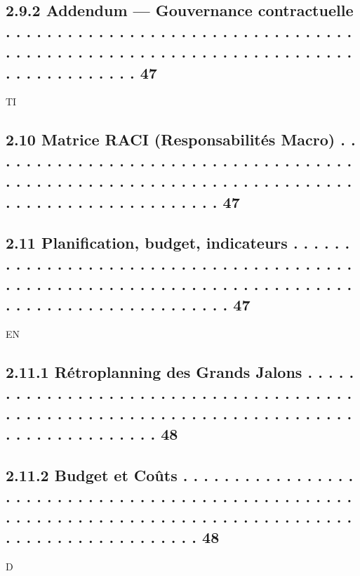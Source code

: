 \documentclass[12pt,landscape,a4paper]{article}
\begin{document}
\subsection{2.9.2               Addendum — Gouvernance contractuelle . . . . . . . . . . . . . . . . . . . . . . . . . . . . . . . . . . . . . . . . . . . . . . . . . . . . . . . . . . . . . . . . . . . . . . . . . . . . . . . . . 47}
\vspace{0.5em}
\vspace{0.5em}
\vspace{0.5em}
\vspace{0.5em}
TI\\
\subsection{2.10    Matrice RACI (Responsabilités Macro) . . . . . . . . . . . . . . . . . . . . . . . . . . . . . . . . . . . . . . . . . . . . . . . . . . . . . . . . . . . . . . . . . . . . . . . . . . . . . . . . . . . . . . . . . . . 47}
\subsection{2.11    Planification, budget, indicateurs . . . . . . . . . . . . . . . . . . . . . . . . . . . . . . . . . . . . . . . . . . . . . . . . . . . . . . . . . . . . . . . . . . . . . . . . . . . . . . . . . . . . . . . . . . . . . . . . 47}
\vspace{0.5em}
\vspace{0.5em}
\vspace{0.5em}
\vspace{0.5em}
EN\\
\subsection{2.11.1              Rétroplanning des Grands Jalons . . . . . . . . . . . . . . . . . . . . . . . . . . . . . . . . . . . . . . . . . . . . . . . . . . . . . . . . . . . . . . . . . . . . . . . . . . . . . . . . . . . . . . . . 48}
\subsection{2.11.2              Budget et Coûts . . . . . . . . . . . . . . . . . . . . . . . . . . . . . . . . . . . . . . . . . . . . . . . . . . . . . . . . . . . . . . . . . . . . . . . . . . . . . . . . . . . . . . . . . . . . . . . . . . . . . . . . 48}
\vspace{0.5em}
\vspace{0.5em}
\vspace{0.5em}
\vspace{0.5em}
D\\
\end{document}
